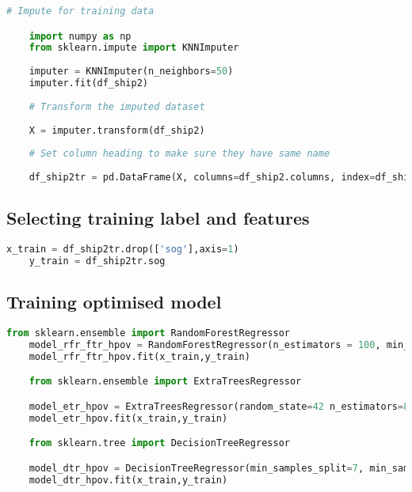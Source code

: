 \begin{lstlisting}[language=Python]
    # Impute for training data 

    import numpy as np
    from sklearn.impute import KNNImputer
    
    imputer = KNNImputer(n_neighbors=50)
    imputer.fit(df_ship2)
    
    # Transform the imputed dataset
    
    X = imputer.transform(df_ship2)
    
    # Set column heading to make sure they have same name 
    
    df_ship2tr = pd.DataFrame(X, columns=df_ship2.columns, index=df_ship2.index)

\end{lstlisting}

\subsection*{Selecting training label and features}

\begin{lstlisting}[language=Python]
    x_train = df_ship2tr.drop(['sog'],axis=1)
    y_train = df_ship2tr.sog

\end{lstlisting}

\subsection*{Training optimised model}

\begin{lstlisting}[language=Python]
    from sklearn.ensemble import RandomForestRegressor
    model_rfr_ftr_hpov = RandomForestRegressor(n_estimators = 100, min_samples_split = 2 ,min_samples_leaf = 1, max_features = 10, max_depth=120, random_state=42)
    model_rfr_ftr_hpov.fit(x_train,y_train)

    from sklearn.ensemble import ExtraTreesRegressor

    model_etr_hpov = ExtraTreesRegressor(random_state=42 n_estimators=800, min_samples_split=9,min_samples_leaf=1, max_features=12, max_depth=120,)
    model_etr_hpov.fit(x_train,y_train)

    from sklearn.tree import DecisionTreeRegressor

    model_dtr_hpov = DecisionTreeRegressor(min_samples_split=7, min_samples_leaf=10,max_features=12, max_depth=8)
    model_dtr_hpov.fit(x_train,y_train)

\end{lstlisting}


